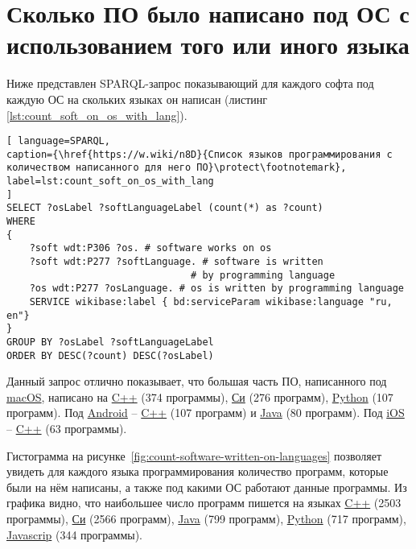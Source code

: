 \section{Сколько ПО было написано под ОС с использованием того или иного языка}
Ниже представлен SPARQL-запрос показывающий для каждого софта под каждую ОС на скольких языках он написан (листинг \ref{lst:count_soft_on_os_with_lang}).

\begin{lstlisting}[ language=SPARQL, 
caption={\href{https://w.wiki/n8D}{Список языков программирования с количеством написанного для него ПО}\protect\footnotemark},
label=lst:count_soft_on_os_with_lang
]
SELECT ?osLabel ?softLanguageLabel (count(*) as ?count)
WHERE
{
	?soft wdt:P306 ?os. # software works on os
	?soft wdt:P277 ?softLanguage. # software is written 
                                # by programming language
	?os wdt:P277 ?osLanguage. # os is written by programming language
	SERVICE wikibase:label { bd:serviceParam wikibase:language "ru, en"}
}
GROUP BY ?osLabel ?softLanguageLabel
ORDER BY DESC(?count) DESC(?osLabel)
\end{lstlisting}

 Данный запрос отлично показывает, что большая часть ПО, написанного под \href{https://www.wikidata.org/wiki/Q14116}{macOS}, написано на \href{https://www.wikidata.org/wiki/Q2407}{C++} (374 программы), \href{https://www.wikidata.org/wiki/Q15777}{Си} (276 программ), \href{https://www.wikidata.org/wiki/Q28865}{Python} (107 программ).
 Под \href{https://www.wikidata.org/wiki/Q94}{Android} -- \href{https://www.wikidata.org/wiki/Q2407}{C++} (107 программ) и \href{https://www.wikidata.org/wiki/Q251}{Java} (80 программ).
 Под \href{https://www.wikidata.org/wiki/Q48493}{iOS} -- \href{https://www.wikidata.org/wiki/Q2407}{C++} (63 программы).


Гистограмма на рисунке~\ref{fig:count-software-written-on-languages} позволяет увидеть для каждого языка программирования количество программ, которые были на нём написаны, а также под какими ОС работают данные программы. Из графика видно, что наибольшее число программ пишется на языках \href{https://www.wikidata.org/wiki/Q2407}{C++} (2503 программы), \href{https://www.wikidata.org/wiki/Q15777}{Си} (2566 программ), \href{https://www.wikidata.org/wiki/Q251}{Java} (799 программ), \href{https://www.wikidata.org/wiki/Q28865}{Python} (717 программ),  \href{https://www.wikidata.org/wiki/Q2005}{Javascrip} (344 программы).


